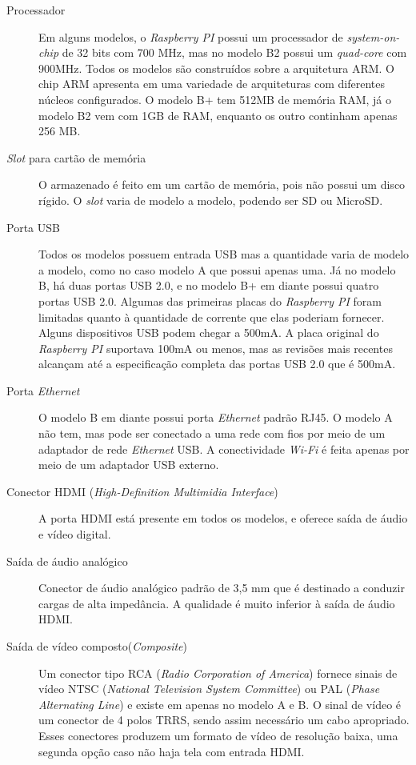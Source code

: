 \documentclass[
	12pt,				%
	openright,			%
	twoside,			%
	a4paper,			%
	chapter=TITLE,		%
	english,			%
	brazil				%
	]{abntex2}
\begin{document}
\begin{description}

\item[Processador]
Em alguns modelos, o \textit{Raspberry PI} possui um processador de \textit{system-on-chip} de 32 bits com 700 MHz, mas no modelo B2 possui um \textit{quad-core} com 900MHz. Todos os modelos são construídos sobre a arquitetura ARM. O chip ARM apresenta em uma variedade de arquiteturas com diferentes núcleos configurados. O modelo B+ tem 512MB de memória RAM, já o modelo B2 vem com 1GB de RAM, enquanto os outro continham apenas 256 MB.
 
\item[\textit{Slot} para cartão de memória]
O armazenado é feito em um cartão de memória, pois não possui um disco rígido. O \textit{slot} varia de modelo a modelo, podendo ser SD ou MicroSD.

\item[Porta USB]
Todos os modelos possuem entrada USB mas a quantidade varia de modelo a modelo, como no caso modelo A que possui apenas uma. Já no modelo B, há duas portas USB 2.0, e no modelo B+ em diante possui quatro portas USB 2.0. Algumas das primeiras placas do \textit{Raspberry PI} foram limitadas quanto à quantidade de corrente que elas poderiam fornecer. Alguns dispositivos USB podem chegar a 500mA. A placa original do \textit{Raspberry PI} suportava 100mA ou menos, mas as revisões mais recentes alcançam até a especificação completa das portas USB 2.0 que é 500mA.

\item[Porta \textit{Ethernet}] 
O modelo B em diante possui porta \textit{Ethernet} padrão RJ45. O modelo A não tem, mas pode ser conectado a uma rede com fios por meio de um adaptador de rede \textit{Ethernet} USB. A conectividade \textit{Wi-Fi} é feita apenas por meio de um adaptador USB externo.

\item[Conector HDMI (\textit{High-Definition Multimidia Interface})] 
A porta HDMI está presente em todos os modelos, e oferece saída de áudio e vídeo digital.

\item[Saída de áudio analógico]
Conector de áudio analógico padrão de 3,5 mm que é destinado a conduzir cargas de alta impedância. A qualidade é muito inferior à saída de áudio HDMI.

\item[Saída de vídeo composto(\textit{Composite})]
Um conector tipo RCA (\textit{Radio Corporation of America}) fornece sinais de vídeo NTSC (\textit{National Television System Committee}) ou PAL (\textit{Phase Alternating Line}) e existe em apenas no modelo A e B. O sinal de vídeo é um conector de 4 polos TRRS, sendo assim necessário um cabo apropriado. Esses conectores produzem um formato de vídeo de resolução baixa, uma segunda opção caso não haja tela com entrada HDMI.


\end{description}
\end{document}
